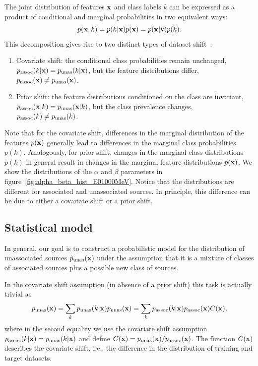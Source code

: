 \documentclass[12pt, a4paper]{article}
\newcommand{\be}{\begin{equation}}
\newcommand{\ee}{\end{equation}}
\newcommand{\ben}{\begin{enumerate}}
\newcommand{\een}{\end{enumerate}}
\newcommand{\bx}{{\bf x}}
\begin{document}
The joint distribution of features $\bx$ and class labels $k$ can be expressed as a product of conditional and marginal probabilities in two equivalent ways:
\be
p(\bx, k) = p(k|\bx) p(\bx) = p(\bx|k) p(k).
\ee
This decomposition gives rise to two distinct types of dataset shift~\citep{MorenoTorres2012AUV}:
\ben
\item
{ Covariate shift}: the conditional class probabilities remain unchanged,\\
{$p_{\rm assoc}(k|\bx) = p_{\rm unas}(k|\bx)$}, but the feature distributions differ, $p_{\rm assoc}(\bx) \neq p_{\rm unas}(\bx)$.
\item
{ Prior shift}: the feature distributions conditioned on the class are invariant, $p_{\rm assoc}(\bx|k) = p_{\rm unas}(\bx|k)$, but the class prevalence changes, $p_{\rm assoc}(k) \neq p_{\rm unas}(k)$.
\een
Note that for the covariate shift, differences in the marginal distribution of the features $p(\bx)$ generally lead to differences in the marginal class probabilities $p(k)$.
Analogously, for prior shift, changes in the marginal class distributions $p(k)$ in general result in changes in the marginal feature distributions $p(\bx)$. We show the distributions of the $\alpha$ and $\beta$ parameters in figure~\ref{fig:alpha_beta_hist_E01000MeV}. Notice that the distributions are different for associated and unassociated sources.
In principle, this difference can be due to either a covariate shift or a prior shift. 

\subsection{Statistical model}
\label{sec:stat-model}

In general, our goal is to construct a probabilistic model for the distribution of unassociated sources $\tilde{p}_{\rm unas}(\bx)$ under the assumption that it is a mixture of classes of associated sources plus a possible new class of sources.

In the covariate shift assumption (in absence of a prior shift) this task is actually trivial as
\be
\label{eq:cov0}
p_{\rm unas}(\bx) 
= \sum_k p_{\rm unas}(k|\bx) p_{\rm unas}(\bx) 
= \sum_k p_{\rm assoc}(k|\bx) p_{\rm assoc}(\bx) C(\bx),
\ee
where in the second equality we use the covariate shift assumption $p_{\rm assoc}(k|\bx) = p_{\rm unas}(k|\bx)$ and define $C(\bx) = p_{\rm unas}(\bx) / p_{\rm assoc}(\bx)$.
The function $C(\bx)$ describes the covariate shift, i.e., the difference in the distribution of training and target datasets.
\end{document}
